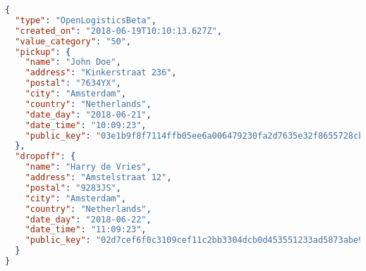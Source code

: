 \begin{lstlisting}[language=json,firstnumber=1]
{
  "type": "OpenLogisticsBeta",
  "created_on": "2018-06-19T10:10:13.627Z",
  "value_category": "50",
  "pickup": {
    "name": "John Doe",
    "address": "Kinkerstraat 236",
    "postal": "7634YX",
    "city": "Amsterdam",
    "country": "Netherlands",
    "date_day": "2018-06-21",
    "date_time": "10:09:23",
    "public_key": "03e1b9f8f7114ffb05ee6a006479230fa2d7635e32f8655728cbc29a77ccdbbfe0"
  },
  "dropoff": {
    "name": "Harry de Vries",
    "address": "Amstelstraat 12",
    "postal": "9283JS",
    "city": "Amsterdam",
    "country": "Netherlands",
    "date_day": "2018-06-22",
    "date_time": "11:09:23",
    "public_key": "02d7cef6f0c3109cef11c2bb3304dcb0d453551233ad5873abe9e292a0f9eff226"
  }
}
\end{lstlisting}
